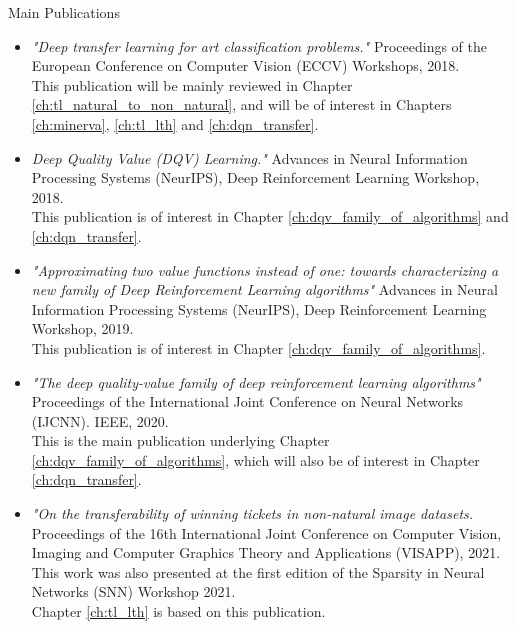 \begin{remark}{Main Publications}
\begin{itemize}
	\item \citet{sabatelli2018deep} \textit{"Deep transfer learning for art classification problems."} Proceedings of the European Conference on Computer Vision (ECCV) Workshops, 2018.
	\\ This publication will be mainly reviewed in Chapter \ref{ch:tl_natural_to_non_natural}, and will be of interest in Chapters \ref{ch:minerva}, \ref{ch:tl_lth} and \ref{ch:dqn_transfer}.

	\item \citet{sabatelli2018deepqv} \textit{Deep Quality Value (DQV) Learning."} Advances in Neural Information Processing Systems (NeurIPS), Deep Reinforcement Learning Workshop, 2018.
	\\ This publication is of interest in Chapter \ref{ch:dqv_family_of_algorithms} and \ref{ch:dqn_transfer}.

	\item \citet{sabatelli2019approximating}  \textit{"Approximating two value functions instead of one: towards characterizing a new family of Deep Reinforcement Learning algorithms"} Advances in Neural Information Processing Systems (NeurIPS), Deep Reinforcement Learning Workshop, 2019. \\
	This publication is of interest in Chapter \ref{ch:dqv_family_of_algorithms}.
	
	\item \citet{sabatelli2020deep} \textit{"The deep quality-value family of deep reinforcement learning algorithms"} Proceedings of the International Joint Conference on Neural Networks (IJCNN). IEEE, 2020.
	\\ This is the main publication underlying Chapter \ref{ch:dqv_family_of_algorithms}, which will also be of interest in Chapter \ref{ch:dqn_transfer}.

	\item \citet{sabatelli2020transferability} \textit{"On the transferability of winning tickets in non-natural image datasets.} Proceedings of the 16th International Joint Conference on Computer Vision, Imaging and Computer Graphics Theory and Applications (VISAPP), 2021.
	\\ This work was also presented at the first edition of the Sparsity in Neural Networks (SNN) Workshop 2021.
	\\ Chapter \ref{ch:tl_lth} is based on this publication.


\end{itemize}
\end{remark}
